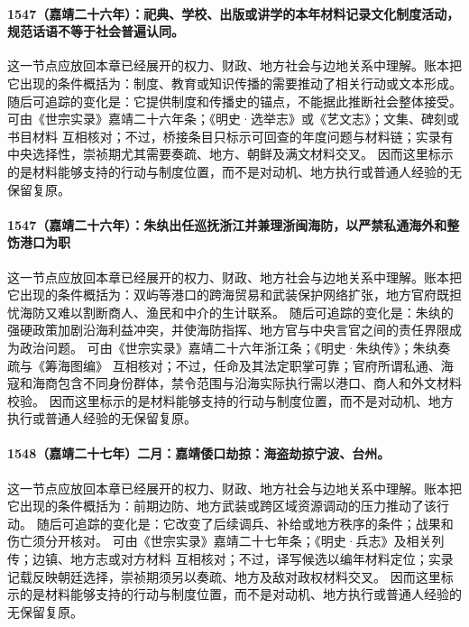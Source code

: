 \paragraph{1547（嘉靖二十六年）：祀典、学校、出版或讲学的本年材料记录文化制度活动，规范话语不等于社会普遍认同。} 这一节点应放回本章已经展开的权力、财政、地方社会与边地关系中理解。账本把它出现的条件概括为：制度、教育或知识传播的需要推动了相关行动或文本形成。 随后可追踪的变化是：它提供制度和传播史的锚点，不能据此推断社会整体接受。 可由《世宗实录》嘉靖二十六年条；《明史·选举志》或《艺文志》；文集、碑刻或书目材料 互相核对；不过，桥接条目只标示可回查的年度问题与材料链；实录有中央选择性，崇祯期尤其需要奏疏、地方、朝鲜及满文材料交叉。 因而这里标示的是材料能够支持的行动与制度位置，而不是对动机、地方执行或普通人经验的无保留复原。

\paragraph{1547（嘉靖二十六年）：朱纨出任巡抚浙江并兼理浙闽海防，以严禁私通海外和整饬港口为职} 这一节点应放回本章已经展开的权力、财政、地方社会与边地关系中理解。账本把它出现的条件概括为：双屿等港口的跨海贸易和武装保护网络扩张，地方官府既担忧海防又难以割断商人、渔民和中介的生计联系。 随后可追踪的变化是：朱纨的强硬政策加剧沿海利益冲突，并使海防指挥、地方官与中央言官之间的责任界限成为政治问题。 可由《世宗实录》嘉靖二十六年浙江条；《明史·朱纨传》；朱纨奏疏与《筹海图编》 互相核对；不过，任命及其法定职掌可靠；官府所谓私通、海寇和海商包含不同身份群体，禁令范围与沿海实际执行需以港口、商人和外文材料校验。 因而这里标示的是材料能够支持的行动与制度位置，而不是对动机、地方执行或普通人经验的无保留复原。

\paragraph{1548（嘉靖二十七年）二月：嘉靖倭口劫掠：海盗劫掠宁波、台州。} 这一节点应放回本章已经展开的权力、财政、地方社会与边地关系中理解。账本把它出现的条件概括为：前期边防、地方武装或跨区域资源调动的压力推动了该行动。 随后可追踪的变化是：它改变了后续调兵、补给或地方秩序的条件；战果和伤亡须分开核对。 可由《世宗实录》嘉靖二十七年条；《明史·兵志》及相关列传；边镇、地方志或对方材料 互相核对；不过，译写候选以编年材料定位；实录记载反映朝廷选择，崇祯期须另以奏疏、地方及敌对政权材料交叉。 因而这里标示的是材料能够支持的行动与制度位置，而不是对动机、地方执行或普通人经验的无保留复原。

